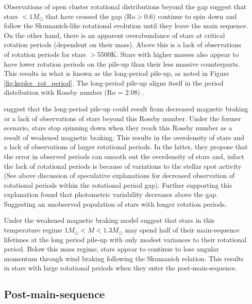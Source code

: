 Observations of open cluster rotational distributions beyond the gap suggest that stars $<1M_{\odot}$ that have crossed the gap (Ro$>$0.6) continue to spin down and follow the Skumanich-like rotational evolution until they leave the main sequence.
On the other hand, there is an apparent overabundance of stars at critical rotation periods (dependent on their mass). 
Above this is a lack of observations of rotation periods for stars $>$5500K.
Stars with higher masses also appear to have lower rotation periods on the pile-up than their less massive counterparts.
This results in what is known as the long-period pile-up, as noted in Figure \ref{fig:kepler_rot_period}.
The long-period pile-up aligns itself in the \citet{mcquillan_rotation_2014} period distribution with Rossby number  (Ro = 2.08) \citep{van_saders_forward_2019}.
 
\citet{van_saders_forward_2019} suggest that the long-period pile-up could result from decreased magnetic braking or a lack of observations of stars beyond this Rossby number.
Under the former scenario, stars stop spinning down when they reach this Rossby number as a result of weakened magnetic braking.
This results in the overdensity of stars and a lack of observations of larger rotational periods.
In the latter, they propose that the error in observed periods can smooth out the overdensity of stars and, infact the lack of rotational periods is because of variations to the stellar spot activity (See above discussion of speculative explanations for decreased observation of rotational periods within the rotational period gap).
Further supporting this explanation \citet{david_further_2022} found that photometric variability decreases above the gap.
Suggesting an unobserved population of stars with longer rotation periods.

Under the weakened magnetic braking model \citet{david_further_2022} suggest that stars in this temperature regime $1M_{\odot} < M < 1.3M_{\odot}$ may spend half of their main-sequence lifetimes at the long period pile-up with only modest variances to their rotational period.
Below this mass regime, stars appear to continue to lose angular momentum through wind braking following the Skumanich relation.
This results in stars with large rotational periods when they enter the post-main-sequence.

\subsection{Post-main-sequence}

